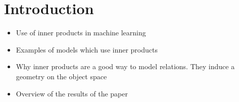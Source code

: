 \section{Introduction}\label{sec:intro}

\begin{itemize}
    \item Use of inner products in machine learning
    \item Examples of models which use inner products
    \item Why inner products are a good way to model relations. They induce a geometry on the object space
    \item Overview of the results of the paper
\end{itemize}